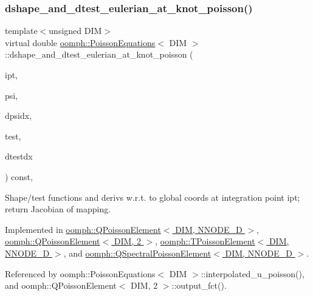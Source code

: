 \subsubsection{\texorpdfstring{dshape\+\_\+and\+\_\+dtest\+\_\+eulerian\+\_\+at\+\_\+knot\+\_\+poisson()}{dshape\_and\_dtest\_eulerian\_at\_knot\_poisson()}\hspace{0.1cm}{\footnotesize\ttfamily [1/2]}}
{\footnotesize\ttfamily template$<$unsigned D\+IM$>$ \\
virtual double \hyperlink{classoomph_1_1PoissonEquations}{oomph\+::\+Poisson\+Equations}$<$ D\+IM $>$\+::dshape\+\_\+and\+\_\+dtest\+\_\+eulerian\+\_\+at\+\_\+knot\+\_\+poisson (\begin{DoxyParamCaption}\item[{const unsigned \&}]{ipt,  }\item[{\hyperlink{classoomph_1_1Shape}{Shape} \&}]{psi,  }\item[{\hyperlink{classoomph_1_1DShape}{D\+Shape} \&}]{dpsidx,  }\item[{\hyperlink{classoomph_1_1Shape}{Shape} \&}]{test,  }\item[{\hyperlink{classoomph_1_1DShape}{D\+Shape} \&}]{dtestdx }\end{DoxyParamCaption}) const\hspace{0.3cm}{\ttfamily [protected]}, {}}



Shape/test functions and derivs w.\+r.\+t. to global coords at integration point ipt; return Jacobian of mapping. 



Implemented in \hyperlink{classoomph_1_1QPoissonElement_a0f51d1468383a7af95b82522038d4e20}{oomph\+::\+Q\+Poisson\+Element$<$ D\+I\+M, N\+N\+O\+D\+E\+\_\+D $>$}, \hyperlink{classoomph_1_1QPoissonElement_a0f51d1468383a7af95b82522038d4e20}{oomph\+::\+Q\+Poisson\+Element$<$ D\+I\+M, 2 $>$}, \hyperlink{classoomph_1_1TPoissonElement_a957fae1b510200732d7da2594d1a69c2}{oomph\+::\+T\+Poisson\+Element$<$ D\+I\+M, N\+N\+O\+D\+E\+\_\+D $>$}, and \hyperlink{classoomph_1_1QSpectralPoissonElement_a294aee49389f189dc34724737aa26efe}{oomph\+::\+Q\+Spectral\+Poisson\+Element$<$ D\+I\+M, N\+N\+O\+D\+E\+\_\+D $>$}.



Referenced by oomph\+::\+Poisson\+Equations$<$ D\+I\+M $>$\+::interpolated\+\_\+u\+\_\+poisson(), and oomph\+::\+Q\+Poisson\+Element$<$ D\+I\+M, 2 $>$\+::output\+\_\+fct().

\mbox{\label{classoomph_1_1PoissonEquations_a09f816da9c9b23fd6a308601fe536cef}} 
